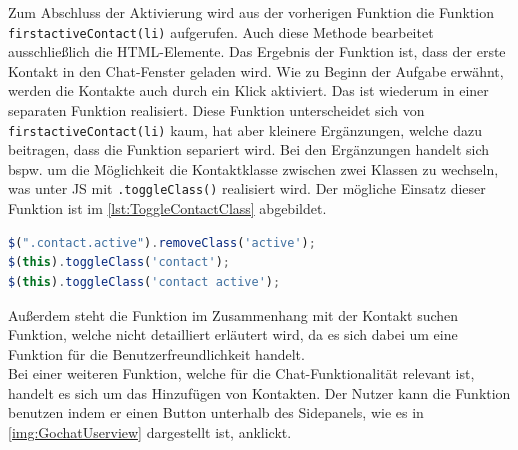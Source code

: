 \documentclass[a4paper,titlepage,halfparskip,12pt]{scrreprt}
\begin{document}
\begin{onehalfspacing}
Zum Abschluss der Aktivierung wird aus der vorherigen Funktion die Funktion \texttt{firstactiveContact(li)} aufgerufen. Auch diese Methode bearbeitet ausschließlich die \ac{HTML}-Elemente. Das Ergebnis der Funktion ist, dass der erste Kontakt in den Chat-Fenster geladen wird. Wie zu Beginn der Aufgabe erwähnt, werden die Kontakte auch durch ein Klick aktiviert. Das ist wiederum in einer separaten Funktion realisiert. Diese Funktion unterscheidet sich von \texttt{firstactiveContact(li)} kaum, hat aber kleinere Ergänzungen, welche dazu beitragen, dass die Funktion separiert wird. Bei den Ergänzungen handelt sich bspw. um die Möglichkeit die Kontaktklasse zwischen zwei Klassen zu wechseln, was unter \ac{JS} mit \texttt{.toggleClass()} realisiert wird. Der mögliche Einsatz dieser Funktion ist im \autoref{lst:ToggleContactClass} abgebildet.
\begin{lstlisting}[language=Javascript,caption=Togglen der Klasse des ausgewählten Kontaktes,label={lst:ToggleContactClass}]
$(".contact.active").removeClass('active');
$(this).toggleClass('contact');
$(this).toggleClass('contact active');
\end{lstlisting}
Außerdem steht die Funktion im Zusammenhang mit der \glqq Kontakt suchen\grqq{} Funktion, welche nicht detailliert erläutert wird, da es sich dabei um eine Funktion für die Benutzerfreundlichkeit handelt.\\
Bei einer weiteren Funktion, welche für die Chat-Funktionalität relevant ist, handelt es sich um das Hinzufügen von Kontakten. Der Nutzer kann die Funktion benutzen indem er einen Button unterhalb des Sidepanels, wie es in \autoref{img:GochatUserview} dargestellt ist, anklickt.

\pagebreak


\end{onehalfspacing}
\end{document}
